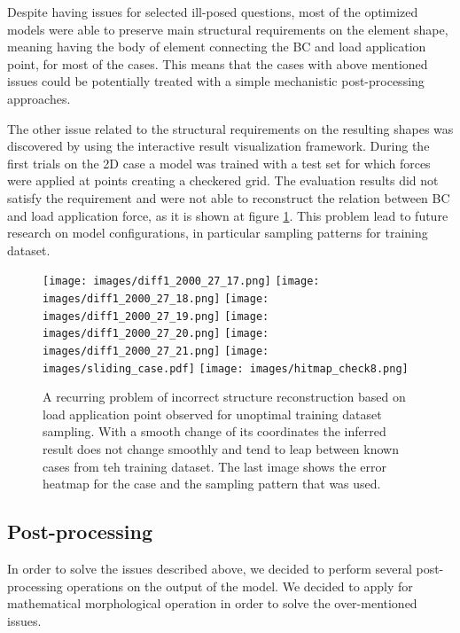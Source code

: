 Despite having issues for selected ill-posed questions, most of the optimized models were able to preserve main structural requirements on the element shape, meaning having the body of element connecting the BC and load application point, for most of the cases.
This means that the cases with above mentioned issues could be potentially treated with a simple mechanistic post-processing approaches.
\medskip

The other issue related to the structural requirements on the resulting shapes was discovered by using the interactive result visualization framework.
During the first trials on the 2D case a model was trained with a test set for which forces were applied at points creating a checkered grid.
The evaluation results did not satisfy the requirement and were not able to reconstruct the relation between BC and load application force, as it is shown at figure \ref{fig:slide_problem}.
This problem lead to future research on model configurations, in particular sampling patterns for training dataset.

\begin{figure}[h]
	\begin{multicols}{7}
		\texttt{[image: images/diff1\_2000\_27\_17.png]}
		\texttt{[image: images/diff1\_2000\_27\_18.png]}
		\texttt{[image: images/diff1\_2000\_27\_19.png]}
		\texttt{[image: images/diff1\_2000\_27\_20.png]}
		\texttt{[image: images/diff1\_2000\_27\_21.png]}
		\texttt{[image: images/sliding\_case.pdf]}
		\texttt{[image: images/hitmap\_check8.png]}	
	\end{multicols}
\caption{A recurring problem of incorrect structure reconstruction based on load application point observed for unoptimal training dataset sampling. With a smooth change of its coordinates the inferred result does not change smoothly and tend to leap between known cases from teh training dataset. The last image shows the error heatmap for the case and the sampling pattern that was used.}
\label{fig:slide_problem}
\end{figure}


\subsection{Post-processing}

In order to solve the issues described above, we decided to perform several post-processing operations on the output of the model.
We decided to apply for mathematical morphological operation in order to solve the over-mentioned issues.
\medskip

